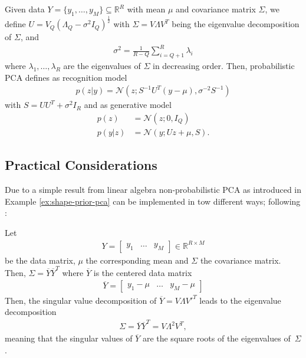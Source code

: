 \begin{definition}
  \label{def:shape-prior-ppca}
  Given data $Y = \{y_1,\ldots,y_M\} \subseteq \mathbb{R}^R$ with mean $\mu$ and
  covariance matrix $\Sigma$, we define $U = V_Q (\Lambda_Q - \sigma^2 I_Q)^{\frac{1}{2}}$
  with $\Sigma = V \Lambda V^T$ being the eigenvalue decomposition of $\Sigma$,
  and
  \begin{align}
    \sigma^2 = \frac{1}{R - Q} \sum_{i = Q + 1}^R \lambda_i
  \end{align}
  where
  $\lambda_1, \ldots, \lambda_R$ are the eigenvalues of $\Sigma$ in decreasing
  order. Then, probabilistic PCA defines as recognition model
  \begin{align}
    p(z|y) = \mathcal{N}(z;S^{-1}U^T(y - \mu), \sigma^{-2}S^{-1})
  \end{align}
  with $S = UU^T + \sigma^2 I_R$ and as generative model
  \begin{align}
    p(z) &= \mathcal{N}(z;0,I_Q)\\
    p(y|z) &= \mathcal{N}(y;Uz + \mu, S).
  \end{align}
\end{definition}

\subsection{Practical Considerations}

Due to a simple result from linear algebra
non-probabilistic PCA as introduced in Example \ref{ex:shape-prior-pca}
can be implemented in tow different ways; following \cite[Section~1.16]{MagnusNeudecker:1999}:

\begin{lemma}
  \label{lem:shape-prior-ppca}
  Let
  \begin{align}
    Y = \left[\begin{matrix}y_1 &\ldots& y_M\end{matrix}\right] \in \mathbb{R}^{R \times M}
  \end{align}
  be the data matrix, $\mu$ the corresponding mean and $\Sigma$ the covariance
  matrix. Then, $\Sigma = \overline{Y}\overline{Y}^T$ where $\overline{Y}$ is
  the centered data matrix
  \begin{align}
    \overline{Y} = \left[\begin{matrix}y_1 - \mu &\ldots& y_M - \mu\end{matrix}\right]
  \end{align}
  Then, the singular value decomposition of $\overline{Y} = V \Lambda V'^T$
  leads to the eigenvalue decomposition
  \begin{align}
    \Sigma = \overline{Y}\overline{Y}^T = V \Lambda^2 V^T,
  \end{align}
  meaning that the singular values of $\overline{Y}$ are the square roots of the
  eigenvalues of~$\Sigma$.
\end{lemma}

